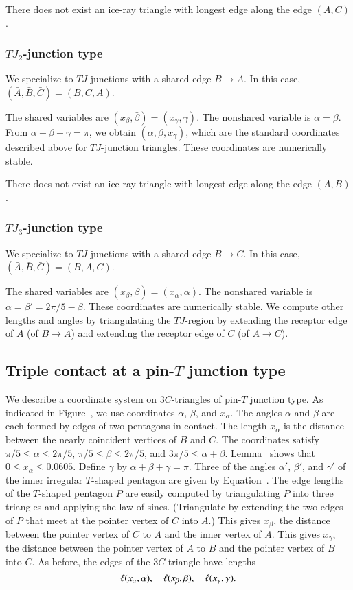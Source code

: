 There does not exist an ice-ray triangle with longest edge along the
edge $(A,C)$.

\subsubsection{$TJ_2$-junction type}

We specialize to $TJ$-junctions with a shared edge $B\to A$. In this
case, $(\bar A,\bar B,\bar C)=(B,C,A)$.

The shared variables are $(\bar x_\beta,\bar\beta)=(x_\gamma,\gamma)$.
The nonshared variable is $\bar\alpha =\beta$.  From
$\alpha+\beta+\gamma=\pi$, we obtain $(\alpha,\beta,x_\gamma)$, which
are the standard coordinates described above for $TJ$-junction
triangles.  These coordinates are numerically stable.

There does not exist an ice-ray triangle with longest edge along the
edge $(A,B)$.

\subsubsection{$TJ_3$-junction type}

We specialize to $TJ$-junctions with a shared edge $B\to C$.
In this case, $(\bar A,\bar B,\bar C)=(B,A,C)$.

The shared variables are $(\bar x_\beta,\bar\beta)=(x_\alpha,\alpha)$.
The nonshared variable is $\bar\alpha=\beta'=2\pi/5-\beta$.  These
coordinates are numerically stable.  We compute other lengths and
angles by triangulating the $TJ$-region by extending the receptor edge
of $A$ (of $B\to A$) and extending the receptor edge of $C$ (of $A\to
C$).

\subsection{Triple contact at a pin-$T$ junction type}
We describe a coordinate system on $3C$-triangles of pin-$T$ junction
type.  As indicated in Figure~, we use coordinates
$\alpha$, $\beta$, and $x_\alpha$.  The angles $\alpha$ and $\beta$
are each formed by edges of two pentagons in contact.  The length
$x_\alpha$ is the distance between the nearly coincident vertices of
$B$ and $C$.  The coordinates satisfy $\pi/5 \le \alpha \le 2\pi/5$,
$\pi/5\le \beta \le 2\pi/5$, and $3\pi/5 \le \alpha+\beta$.
Lemma~ shows that $0\le x_\alpha\le 0.0605$.  Define
$\gamma$ by $\alpha+\beta+\gamma = \pi$.  Three of the angles
$\alpha'$, $\beta'$, and $\gamma'$ of the inner irregular $T$-shaped
pentagon are given by Equation~.  The edge lengths of the
$T$-shaped pentagon $P$ are easily computed by triangulating $P$ into
three triangles and applying the law of sines.  (Triangulate by
extending the two edges of $P$ that meet at the pointer vertex of $C$
into $A$.)  This gives $x_\beta$, the distance between the pointer
vertex of $C$ to $A$ and the inner vertex of $A$.  This gives
$x_\gamma$, the distance between the pointer vertex of $A$ to $B$ and
the pointer vertex of $B$ into $C$.  As before, the edges of the
$3C$-triangle have lengths
\[
\ell(x_\alpha,\alpha),\quad \ell(x_\beta,\beta),\quad \ell(x_\gamma,\gamma).
\]

